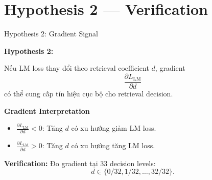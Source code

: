 

\section{Hypothesis 2 — Verification}

\begin{frame}{Hypothesis 2: Gradient Signal}

\textbf{Hypothesis 2:}

Nếu LM loss thay đổi theo retrieval coefficient $d$, gradient
\[
\frac{\partial L_{\mathrm{LM}}}{\partial d}
\]
có thể cung cấp tín hiệu cục bộ cho retrieval decision.

\vspace{0.3cm}

\textbf{Gradient Interpretation}
\begin{itemize}
    \item $\frac{\partial L_{\mathrm{LM}}}{\partial d}<0$:
    Tăng $d$ có xu hướng giảm LM loss.

    \item $\frac{\partial L_{\mathrm{LM}}}{\partial d}>0$:
    Tăng $d$ có xu hướng tăng LM loss.
\end{itemize}

\vspace{0.2cm}

\textbf{Verification:}
Đo gradient tại 33 decision levels:
\[
d \in \{0/32,1/32,\ldots,32/32\}.
\]

\end{frame}



